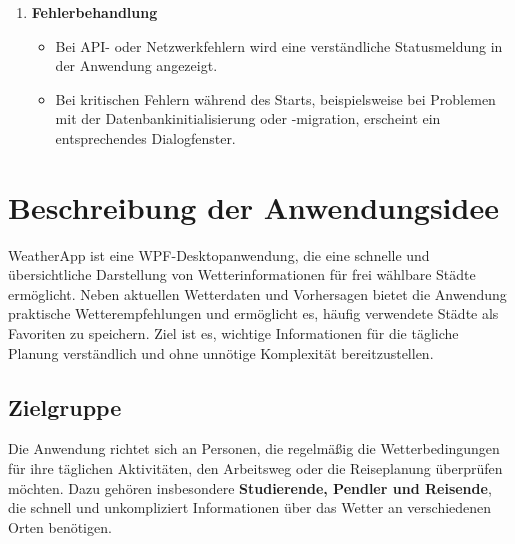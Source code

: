 \documentclass[12pt,a4paper]{article}
\begin{document}
\begin{enumerate}
\begin{itemize}
      \item Ein gefüllter Stern zeigt an, dass die Stadt bereits als
        Favorit gespeichert ist. Durch erneutes Anklicken wird sie aus
        den Favoriten entfernt.
      \item Gespeicherte Favoriten können über die Seitenleiste
        ausgewählt oder entfernt werden.
      \item In den Einstellungen kann zwischen Celsius und Fahrenheit
        als Temperatureinheit gewechselt werden.
      \item Die aktuell ausgewählte Stadt kann als Standardstadt
        gespeichert werden.
    \end{itemize}
  \item \textbf{Fehlerbehandlung}
    \begin{itemize}
      \item Bei API- oder Netzwerkfehlern wird eine verständliche
        Statusmeldung in der Anwendung angezeigt.
      \item Bei kritischen Fehlern während des Starts, beispielsweise
        bei Problemen mit der Datenbankinitialisierung oder
        -migration, erscheint ein entsprechendes Dialogfenster.
    \end{itemize}
\end{enumerate}

\section{Beschreibung der Anwendungsidee}
WeatherApp ist eine WPF-Desktopanwendung, die eine schnelle und
übersichtliche Darstellung von Wetterinformationen für frei wählbare
Städte ermöglicht. Neben aktuellen Wetterdaten und Vorhersagen bietet
die Anwendung praktische Wetterempfehlungen und ermöglicht es, häufig
verwendete Städte als Favoriten zu speichern. Ziel ist es, wichtige
Informationen für die tägliche Planung verständlich und ohne unnötige
Komplexität bereitzustellen.

\subsection{Zielgruppe}
Die Anwendung richtet sich an Personen, die regelmäßig die
Wetterbedingungen für ihre täglichen Aktivitäten, den Arbeitsweg oder
die Reiseplanung überprüfen möchten. Dazu gehören insbesondere
\textbf{Studierende, Pendler und Reisende}, die schnell und unkompliziert
Informationen über das Wetter an verschiedenen Orten benötigen.
\end{document}
